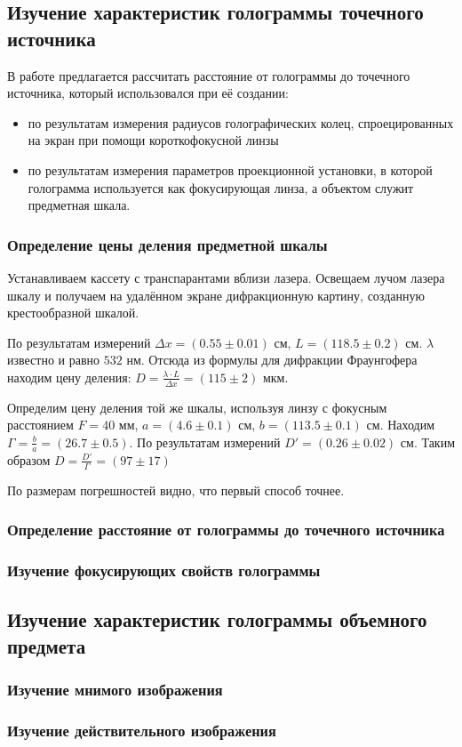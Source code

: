 
\subsection{Изучение характеристик голограммы точечного источника}

    В работе предлагается рассчитать расстояние от голограммы до точечного источника, 
    который использовался при её создании:
    \begin{itemize}
        \item по результатам измерения радиусов голографических колец,
              спроецированных на экран при помощи короткофокусной линзы
        \item по результатам измерения параметров проекционной установки, 
              в которой голограмма используется как фокусирующая линза, 
              а объектом служит предметная шкала.
    \end{itemize}

    \subsubsection*{Определение цены деления предметной шкалы}

        Устанавливаем кассету с транспарантами вблизи лазера. Освещаем лучом лазера шкалу и 
        получаем на удалённом экране дифракционную картину, созданную крестообразной шкалой.

        По результатам измерений $\Delta x = (0.55 \pm 0.01)$ см, $L = (118.5 \pm 0.2)$ см.
        $\lambda$ известно и равно $532$ нм. Отсюда из формулы для дифракции Фраунгофера
        находим цену деления: $D = \frac{\lambda \cdot L}{\Delta x} = (115 \pm 2)$ мкм.

        Определим цену деления той же шкалы, используя линзу с фокусным расстоянием
        $F = 40$ мм, $a = (4.6 \pm 0.1)$ см, $b = (113.5 \pm 0.1)$ см. Находим
        $\Gamma = \frac{b}{a} = (26.7 \pm 0.5)$. По результатам измерений
        $D' = (0.26 \pm 0.02)$ см. Таким образом $D = \frac{D'}{\Gamma} = (97 \pm 17)$

        По размерам погрешностей видно, что первый способ точнее.

    \subsubsection*{Определение расстояние от голограммы до точечного источника}

    \subsubsection*{Изучение фокусирующих свойств голограммы}

\subsection{Изучение характеристик голограммы объемного предмета}

    \subsubsection*{Изучение мнимого изображения}

    \subsubsection*{Изучение действительного изображения}

